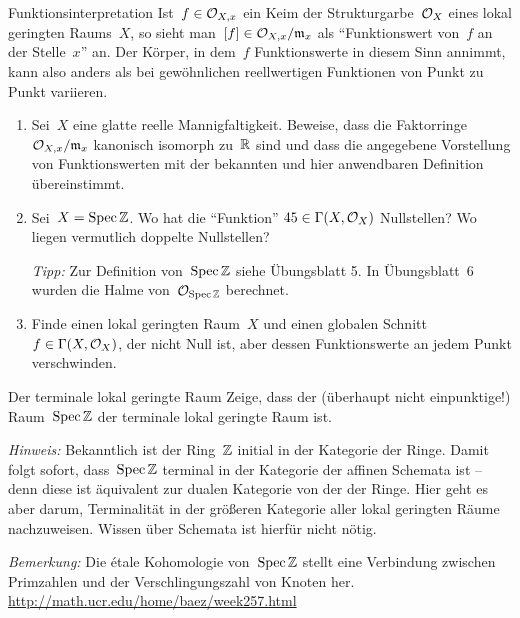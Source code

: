 \documentclass{uebblatt}
\begin{document}
\begin{aufgabe}{Funktionsinterpretation}
Ist~$f \in \mathcal{O}_{X,x}$ ein Keim der Strukturgarbe~$\mathcal{O}_X$ eines lokal geringten
Raums~$X$, so sieht man~$[f] \in \mathcal{O}_{X,x}/\mathfrak{m}_x$ als "`Funktionswert von~$f$ an
der Stelle~$x$"' an. Der Körper, in dem~$f$ Funktionswerte in diesem Sinn
annimmt, kann also anders als bei gewöhnlichen reellwertigen Funktionen von
Punkt zu Punkt variieren.
\begin{enumerate}
\item Sei~$X$ eine glatte reelle Mannigfaltigkeit. Beweise, dass die
Faktorringe~$\mathcal{O}_{X,x}/\mathfrak{m}_x$ kanonisch isomorph zu~$\mathbb{R}$ sind und dass die
angegebene Vorstellung von Funktionswerten mit der bekannten und hier
anwendbaren Definition übereinstimmt.
\item Sei~$X = \operatorname{Spec} \mathbb{Z}$. Wo hat die "`Funktion"' $45 \in \Gamma(X,\mathcal{O}_X)$
Nullstellen? Wo liegen vermutlich doppelte Nullstellen?

{\tiny\emph{Tipp:} Zur Definition von~$\operatorname{Spec}\mathbb{Z}$ siehe Übungsblatt 5. In
Übungsblatt~6 wurden die Halme von~$\mathcal{O}_{\operatorname{Spec}\mathbb{Z}}$ berechnet.\par}
\item Finde einen lokal geringten Raum~$X$ und einen globalen Schnitt~$f \in
\Gamma(X,\mathcal{O}_X)$, der nicht Null ist, aber dessen Funktionswerte an jedem Punkt
verschwinden.
\end{enumerate}
\end{aufgabe}

\newpage

\begin{aufgabe}{Der terminale lokal geringte Raum}
Zeige, dass der (überhaupt nicht einpunktige!) Raum~$\operatorname{Spec} \mathbb{Z}$ der terminale
lokal geringte Raum ist.

{\tiny\emph{Hinweis:} Bekanntlich ist der Ring~$\mathbb{Z}$ initial in der Kategorie der
Ringe. Damit folgt sofort, dass~$\operatorname{Spec}\mathbb{Z}$ terminal in der Kategorie der
affinen Schemata ist -- denn diese ist äquivalent zur dualen Kategorie von der
der Ringe. Hier geht es aber darum, Terminalität in der größeren Kategorie
aller lokal geringten Räume nachzuweisen. Wissen über Schemata ist hierfür
nicht nötig.\par}

{\tiny
\emph{Bemerkung:} Die étale Kohomologie von~$\operatorname{Spec}\mathbb{Z}$ stellt eine Verbindung
zwischen Primzahlen und der Verschlingungszahl von Knoten her.
\url{http://math.ucr.edu/home/baez/week257.html}\par}
\end{aufgabe}
\end{document}
